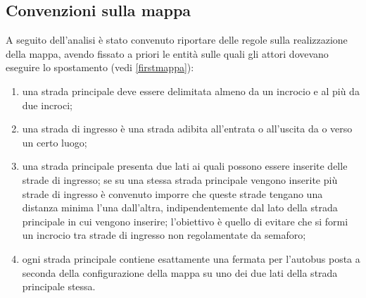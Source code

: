 \subsection{Convenzioni sulla mappa}
A seguito dell'analisi è stato convenuto riportare delle regole sulla
realizzazione della mappa, avendo fissato a priori le entità sulle quali gli
attori dovevano eseguire lo spostamento (vedi \ref{firstmappa}):
\begin{enumerate}
\item una strada principale deve essere delimitata almeno da un incrocio e al
più da due incroci;
\item una strada di ingresso è una strada adibita all'entrata o all'uscita da o
verso un certo luogo;
\item una strada principale presenta due lati ai quali possono essere inserite
delle strade di ingresso; se su una stessa strada principale vengono
inserite più strade di ingresso è convenuto imporre che queste strade tengano
una distanza minima l'una dall'altra, indipendentemente dal lato della strada
principale in cui vengono inserire; l'obiettivo è quello di evitare che si
formi un incrocio tra strade di ingresso non regolamentate da semaforo;
\item ogni strada principale contiene esattamente una fermata per l'autobus
posta a seconda della configurazione della mappa su uno dei due lati della
strada principale stessa.
\end{enumerate}


